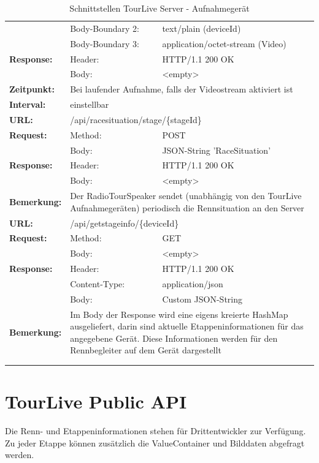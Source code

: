 {\begin{longtable}{ p{2.5cm} p{3.5cm} p{6cm}}
		& Body-Boundary 2: & text/plain (deviceId) \\
		& Body-Boundary 3: & application/octet-stream (Video) \\
	\textbf{Response:} & Header: & HTTP/1.1 200 OK \\
		& Body: & <empty> \\
	\textbf{Zeitpunkt:} & \multicolumn{2}{p{10cm}}{Bei laufender Aufnahme, falls der Videostream aktiviert ist} \\ 
	\textbf{Interval:} & \multicolumn{2}{p{10cm}}{einstellbar} \\
\hline
\hline
	\textbf{URL:} & \multicolumn{2}{p{10cm}}{/api/racesituation/stage/\{stageId\}} \\
	\textbf{Request:} & Method: & POST \\
		& Body: & JSON-String 'RaceSituation'\\	
	\textbf{Response:} & Header: & HTTP/1.1 200 OK \\
		& Body: & <empty> \\	
	\textbf{Bemerkung:} & \multicolumn{2}{p{10cm}}{Der RadioTourSpeaker sendet (unabhängig von den TourLive Aufnahmegeräten) periodisch die Rennsituation an den Server} \\
\hline
\hline
	\textbf{URL:} & \multicolumn{2}{p{10cm}}{/api/getstageinfo/\{deviceId\}} \\
	\textbf{Request:} & Method: & GET \\
		& Body: & <empty>\\	
	\textbf{Response:} & Header: & HTTP/1.1 200 OK \\
		& Content-Type: & application/json \\
		& Body: & Custom JSON-String \\	
	\textbf{Bemerkung:} & \multicolumn{2}{p{10cm}}{Im Body der Response wird eine eigens kreierte HashMap ausgeliefert, darin sind aktuelle Etappeninformationen für das angegebene Gerät. Diese Informationen werden für den Rennbegleiter auf dem Gerät dargestellt} \\
\hline
\hline  \\
\caption{Schnittstellen TourLive Server - Aufnahmegerät}
\end{longtable} }

\section{TourLive Public API}
\label{sec:tourlivepublicapi}
Die Renn- und Etappeninformationen stehen für Drittentwickler zur Verfügung. Zu jeder Etappe können zusätzlich die ValueContainer und Bilddaten abgefragt werden.

